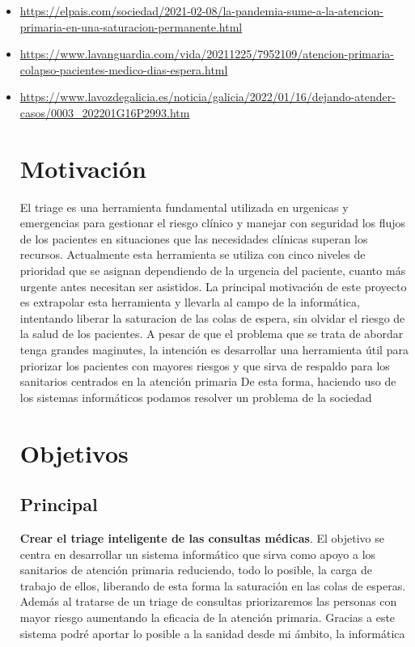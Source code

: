 \begin{itemize}
    \item \url{https://elpais.com/sociedad/2021-02-08/la-pandemia-sume-a-la-atencion-primaria-en-una-saturacion-permanente.html} 
    \item \url{https://www.lavanguardia.com/vida/20211225/7952109/atencion-primaria-colapso-pacientes-medico-dias-espera.html}
    \item \url{https://www.lavozdegalicia.es/noticia/galicia/2022/01/16/dejando-atender-casos/0003_202201G16P2993.htm}

\section{Motivación}
El triage es una herramienta fundamental utilizada en urgenicas y emergencias para gestionar el riesgo clínico y manejar 
con seguridad los flujos de los pacientes en situaciones que las necesidades clínicas superan los recursos. 
Actualmente esta herramienta se utiliza con cinco niveles de prioridad que se asignan dependiendo de la urgencia 
del paciente, cuanto más urgente antes necesitan ser asistidos. 
La principal motivación de este proyecto es extrapolar esta herramienta y llevarla al campo de la informática, intentando liberar
la saturacion de las colas de espera, sin olvidar el riesgo de la salud de los pacientes.
A pesar de que el problema que se trata de abordar tenga grandes maginutes, la intención es desarrollar una herramienta útil para priorizar
los pacientes con mayores riesgos y que sirva de respaldo para los sanitarios centrados en la atención primaria
De esta forma, haciendo uso de los sistemas informáticos podamos resolver un problema de la sociedad

\section{Objetivos}

\subsection{Principal}

\textbf{Crear el triage inteligente de las consultas médicas}. El objetivo se centra en desarrollar un sistema informático que sirva
como apoyo a los sanitarios de atención primaria reduciendo, todo lo posible, la carga de trabajo de ellos, liberando de esta forma 
la saturación en las colas de esperas. Además al tratarse de un triage de consultas priorizaremos las personas con mayor riesgo 
aumentando la eficacia de la atención primaria. Gracias a este sistema podré aportar lo posible a la sanidad desde mi ámbito, la informática


\end{itemize}
